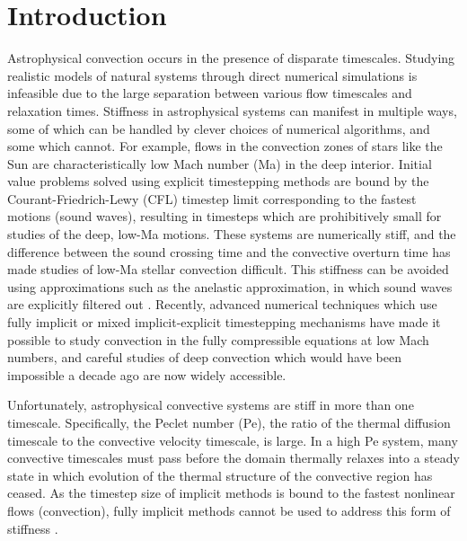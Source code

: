 \documentclass[aps, pre, onecolumn, nofootinbib, notitlepage, groupedaddress, amsfonts, amssymb, amsmath, longbibliography]{revtex4-1}
\begin{document}
\section{Introduction}
\label{sec:intro}
Astrophysical convection occurs in the presence of disparate timescales. 
Studying realistic models of natural systems through direct numerical
simulations is infeasible due to the
large separation between various flow timescales and relaxation times.
Stiffness in astrophysical systems can manifest in multiple ways, some of which can
be handled by clever choices of numerical algorithms, and some which cannot.
For example,
flows in the convection zones of stars like the Sun are characteristically low Mach number
(Ma) in the deep interior. Initial value problems solved using
explicit timestepping methods are bound by the Courant-Friedrich-Lewy
(CFL) timestep limit corresponding to the fastest motions (sound
waves), resulting in timesteps which are prohibitively
small for studies of the deep, low-Ma motions. These systems are numerically
stiff, and the difference between
the sound crossing time and the convective overturn time has made studies of low-Ma stellar
convection difficult. This stiffness can be avoided using approximations such as
the anelastic approximation, in which sound waves are explicitly filtered out
\cite{brown&all2010, featherstone&hindman2016}.
Recently, advanced numerical techniques which use fully implicit 
\cite{viallet&all2011, viallet&all2013, viallet&all2016} or mixed
implicit-explicit \cite{lecoanet&all2014, anders&brown2017, bordwell&all2018} 
timestepping mechanisms have made it possible to study
convection in the fully compressible equations at low Mach numbers, 
and careful studies of deep convection which
would have been impossible a decade ago are now widely accessible.

Unfortunately, astrophysical convective systems are stiff in more than one 
timescale. Specifically, the Peclet number (Pe), the ratio of the thermal
diffusion timescale to the convective velocity timescale, is large.
In a high Pe system, many convective timescales must pass before 
the domain thermally relaxes into a steady state in which
evolution of the thermal structure of the convective region has ceased.
As the timestep size of implicit methods is bound to the fastest nonlinear flows
(convection), fully implicit methods cannot be used to address this form of stiffness
\cite{viallet&all2011, viallet&all2013, viallet&all2016}. 
\end{document}

